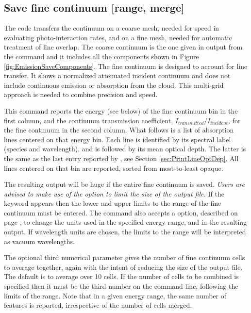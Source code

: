 \subsection{Save fine continuum [range, merge]}

The code transfers the continuum on a coarse mesh, needed for speed in
evaluating photo-interaction rates, and on a fine mesh, needed for automatic
treatment of line overlap.
The coarse continuum is the one given in output
from the  command and it includes all the components shown in Figure \ref{fig:EmissionSaveComponents}.
The fine continuum is designed to account for line transfer.
It shows a normalized attenuated incident continuum and 
does not include continuous
emission or absorption from the cloud.  
This multi-grid approach is needed to combine precision and speed.

This command reports the energy (see below) of the fine continuum bin in the
first column, and the continuum transmission coefficient,
$I_{transmitted}/I_{incident}$, for the fine continuum in the second column.
What follows is a list of absorption lines centered on that energy bin.
Each line is identified by its spectral label (species and wavelength), and is
followed by its mean optical depth.
The latter is the same as the last entry reported by
, see Section \ref{sec:PrintLineOptDep}.
All lines centered on that bin are reported, sorted from most-to-least opaque.

The resulting output will be huge if the entire fine continuum is saved.
{\it Users are advised to make use of the {\rm{}} option
to limit the size of the output file.}
If the keyword  appears then
the lower and upper limits to the range
of the fine continuum must be entered.
The command also accepts
a  option,
described on page \pageref{output_units}, to change the units used
in the specified energy range, and in the resulting output. If wavelength
units are chosen, the limits to the range will be interpreted as
vacuum wavelengths.

The optional third numerical parameter gives the number
of fine continuum cells to average together, again with the intent of
reducing the size of the output file.  The default is to average over 10
cells.  If the number of cells to be combined is specified then it must
be the third number on the command line, following the limits
of the range.
Note that in a given energy range, the same number of features is reported,
irrespective of the number of cells merged.

